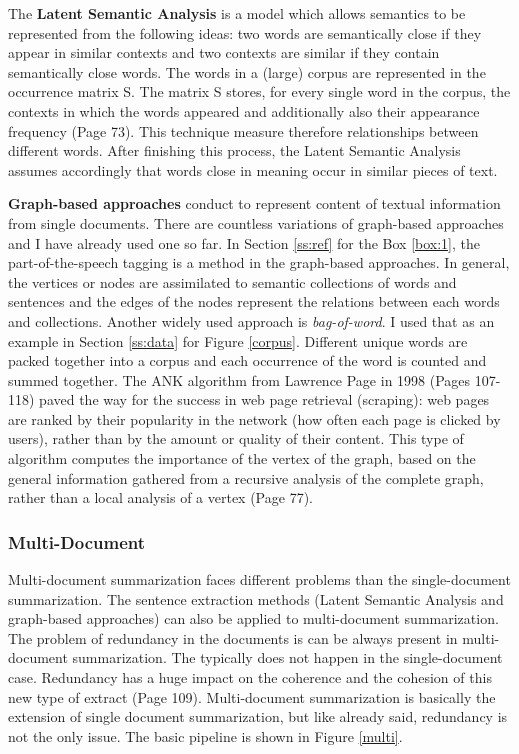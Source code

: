The \textbf{Latent Semantic Analysis} \cite{Deerwester90indexingby} is a model which allows semantics to be represented from the following ideas: two words are semantically close if they appear in similar contexts and two contexts are similar if they contain semantically close words. The words in a (large) corpus are represented in the occurrence matrix S. The matrix S stores, for every single word in the corpus, the contexts in which the words appeared and additionally also their appearance frequency \cite{juan} (Page 73). This technique measure therefore relationships between different words. After finishing this process, the Latent Semantic Analysis assumes accordingly that words close in meaning occur in similar pieces of text.

\textbf{Graph-based approaches} conduct to represent content of textual information from single documents. There are countless variations of graph-based approaches and I have already used one so far. In Section \ref{ss:ref} for the Box \ref{box:1}, the part-of-the-speech tagging is a method in the graph-based approaches. In general, the vertices or nodes are assimilated to semantic collections of words and sentences and the edges of the nodes represent the relations between each words and collections. 
Another widely used approach is \textit{bag-of-word}. I used that as an example in Section \ref{ss:data} for Figure \ref{corpus}. Different unique words are packed together into a corpus and each occurrence of the word is counted and summed together. The ANK algorithm from Lawrence Page in 1998 \cite{brin1998anatomy} (Pages 107-118) paved the way for the success in web page retrieval (scraping): web pages are ranked by their popularity in the network (how often each page is clicked by users), rather than by the amount or quality of their content. This type of algorithm computes the importance of the vertex of the graph, based on the general information gathered from a recursive analysis of the complete graph, rather than a local analysis of a vertex \cite{juan} (Page 77).

\subsubsection{Multi-Document}\label{ss:multi}

Multi-document summarization faces different problems than the single-document summarization. The sentence extraction methods (Latent Semantic Analysis and graph-based approaches) can also be applied to multi-document summarization. The problem of redundancy in the documents is can be always present in multi-document summarization. The typically does not happen in the single-document case. Redundancy has a huge impact on the coherence and the cohesion of this new type of extract \cite{juan} (Page 109). Multi-document summarization is basically the extension of single document summarization, but like already said, redundancy is not the only issue. The basic pipeline is shown in Figure \ref{multi}. 

